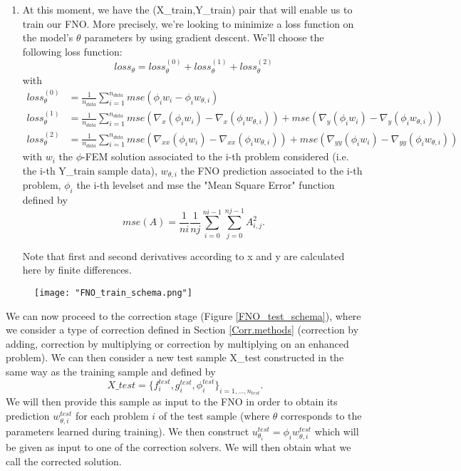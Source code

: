 \begin{enumerate}[label=\textbullet]
\begin{Rem}
	\end{Rem}
	\item At this moment, we have the (X\_train,Y\_train) pair that will enable us to train our FNO. More precisely, we're looking to minimize a loss function on the model's $\theta$ parameters by using gradient descent. We'll choose the following loss function:
	\begin{equation*}
		loss_\theta = loss_\theta^{(0)} + loss_\theta^{(1)} + loss_\theta^{(2)}
	\end{equation*}
	with 
	\begin{align*}
		loss_\theta^{(0)} &= \frac{1}{n_{data}}\sum_{i=1}^{n_{data}} mse(\phi_iw_i-\phi_iw_{\theta,i}) \\
		loss_\theta^{(1)} &= \frac{1}{n_{data}}\sum_{i=1}^{n_{data}} mse(\nabla_x(\phi_iw_i)-\nabla_x(\phi_iw_{\theta,i}))+mse(\nabla_y(\phi_iw_i)-\nabla_y(\phi_iw_{\theta,i})) \\
		loss_\theta^{(2)} &= \frac{1}{n_{data}}\sum_{i=1}^{n_{data}} mse(\nabla_{xx}(\phi_iw_i)-\nabla_{xx}(\phi_iw_{\theta,i})) + mse(\nabla_{yy}(\phi_iw_i)-\nabla_{yy}(\phi_iw_{\theta,i}))
	\end{align*}
	with $w_i$ the $\phi$-FEM solution associated to the i-th problem considered (i.e. the i-th Y\_train sample data), $w_{\theta,i}$ the FNO prediction associated to the i-th problem, $\phi_i$ the i-th levelset and mse the "Mean Square Error" function defined by
	\begin{equation*}
		mse(A)=\frac{1}{ni}\frac{1}{nj}\sum_{i=0}^{ni-1}\sum_{j=0}^{nj-1}A_{i,j}^2.
	\end{equation*}
	\begin{Rem}
		Note that first and second derivatives according to x and y are calculated here by finite differences.
	\end{Rem}
\end{enumerate}

\begin{figure}[H]
	\centering
	\texttt{[image: "FNO\_train\_schema.png"]}
	\label{FNO_train_schema}
\end{figure}

We can now proceed to the correction stage (Figure \ref{FNO_test_schema}), where we consider a type of correction defined in Section \ref{Corr.methods} (correction by adding, correction by multiplying or correction by multiplying on an enhanced problem). We can then consider a new test sample X\_test constructed in the same way as the training sample and defined by
\begin{equation*}
	X\_test = \{f^{test}_i,g^{test}_i,\phi^{test}_i\}_{i=1,\dots,n_{test}}.
\end{equation*}
We will then provide this sample as input to the FNO in order to obtain its prediction $w^{test}_{\theta,i}$ for each problem $i$ of the test sample (where $\theta$ corresponds to the parameters learned during training). We then construct $u^{test}_{\theta_i}=\phi_i w^{test}_{\theta,i}$ which will be given as input to one of the correction solvers. We will then obtain what we call the corrected solution.


